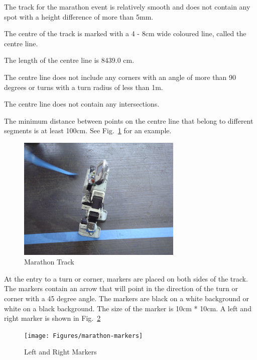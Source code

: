 \documentclass[12pt]{hurocup}
\begin{document}
\begin{lawlist}[MR]

\item The track for the marathon event is relatively smooth and does
  not contain any spot with a height difference of more than 5mm.

\item The centre of the track is marked with a 4 - 8cm wide coloured
line, called the centre line.

\item The length of the centre line is 8439.0 cm.

\item The centre line does not include any corners with an
 angle of more than 90 degrees or turns with a turn radius of less
 than 1m.

\item The centre line does not contain any intersections.

\item The minimum distance between points on the centre line that
 belong to different segments is at least 100cm.  See
 Fig.~\ref{fig:marathon-track} for an example.

\begin{figure}
  \begin{center}
    \includegraphics[width=0.7\textwidth]{Figures/marathon-track}
  \end{center}
  \caption{Marathon Track}
  \label{fig:marathon-track}
\end{figure}

\item At the entry to a turn or corner, markers are placed on both
  sides of the track. The markers contain an arrow that will point in
  the direction of the turn or corner with a 45 degree angle. The
  markers are black on a white background or white on a black
  background. The size of the marker is 10cm * 10cm. A left and right
  marker is shown in Fig.~\ref{fig:markers}

\begin{figure}
  \begin{center}
    \texttt{[image: Figures/marathon-markers]}
  \end{center}
  \caption{Left and Right Markers}
  \label{fig:markers}
\end{figure}

\end{lawlist}
\end{document}
